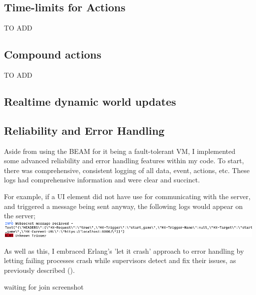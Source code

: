 \documentclass[]{final}
\begin{document}
\subsection{Time-limits for Actions}
TO ADD

\subsection{Compound actions}
TO ADD

\subsection{Realtime dynamic world updates}

\subsection{Reliability and Error Handling}

Aside from using the BEAM for it being a fault-tolerant VM, I implemented some
advanced reliability and error handling features within my code. To start, there
was comprehensive, consistent logging of all data, event, actions, etc. These
logs had comprehensive information and were clear and succinct.

For example, if a UI element did not have use for communicating with the server,
and triggered a message being sent anyway, the following logs would appear on the
server;
\includegraphics[width=\linewidth]{unknown_trigger_alert.png}

As well as this, I embraced Erlang's 'let it crash' approach to error
handling by letting failing processes crash while supervisors detect and
fix their issues, as previously described {\hypersetup{linkcolor=teal}(\pageref{faultErlang})}.

waiting for join screenshot
\end{document}
